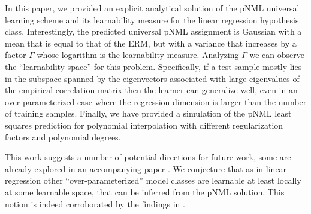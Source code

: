 \documentclass[conference,letterpaper]{IEEEtran}
\begin{document}
In this paper, we provided an explicit analytical solution of the pNML universal learning scheme and its learnability measure for the linear regression hypothesis class. 
Interestingly, the predicted universal pNML assignment is Gaussian with a mean that is equal to that of the ERM, but with a variance that increases by a factor $\Gamma$ whose logarithm is the learnability measure.
Analyzing $\Gamma$ we can observe the ``learnability space'' for this problem. Specifically, 
if a test sample mostly lies in the subspace spanned by the eigenvectors associated with large eigenvalues of the empirical correlation matrix then the learner can generalize well, even in an over-parameterized case where the regression dimension is larger than the number of training samples. 
Finally, we have provided a simulation of the pNML least squares prediction for polynomial interpolation with different regularization factors and polynomial degrees. 

This work suggests a number of potential directions for future work, some are already explored in an accompanying paper \cite{pNML_neural_networks}. We conjecture that as in linear regression other ``over-parameterized'' model classes are learnable at least locally at some learnable space, that can be inferred from the pNML solution. This notion is indeed corroborated by the findings in \cite{pNML_neural_networks}.





%
%




\end{document}
